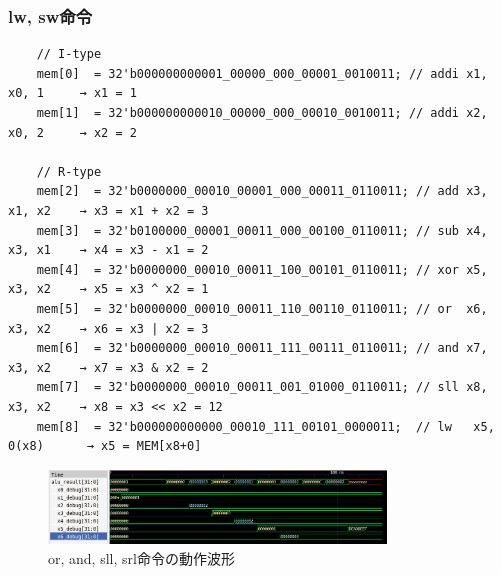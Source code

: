 \documentclass[a4paper, 11pt]{article}
\begin{document}
\subsubsection{lw, sw命令}
\begin{lstlisting}
    // I-type
    mem[0]  = 32'b000000000001_00000_000_00001_0010011; // addi x1, x0, 1     → x1 = 1
    mem[1]  = 32'b000000000010_00000_000_00010_0010011; // addi x2, x0, 2     → x2 = 2

    // R-type
    mem[2]  = 32'b0000000_00010_00001_000_00011_0110011; // add x3, x1, x2    → x3 = x1 + x2 = 3
    mem[3]  = 32'b0100000_00001_00011_000_00100_0110011; // sub x4, x3, x1    → x4 = x3 - x1 = 2
    mem[4]  = 32'b0000000_00010_00011_100_00101_0110011; // xor x5, x3, x2    → x5 = x3 ^ x2 = 1
    mem[5]  = 32'b0000000_00010_00011_110_00110_0110011; // or  x6, x3, x2    → x6 = x3 | x2 = 3
    mem[6]  = 32'b0000000_00010_00011_111_00111_0110011; // and x7, x3, x2    → x7 = x3 & x2 = 2
    mem[7]  = 32'b0000000_00010_00011_001_01000_0110011; // sll x8, x3, x2    → x8 = x3 << x2 = 12
    mem[8]  = 32'b000000000000_00010_111_00101_0000011;  // lw   x5, 0(x8)      → x5 = MEM[x8+0]
\end{lstlisting}

\begin{figure}[h]
\centering
\includegraphics[width=0.8\textwidth]{images/lw.png}
\caption{or, and, sll, srl命令の動作波形}
\label{fig:addwave}
\end{figure}
\end{document}
